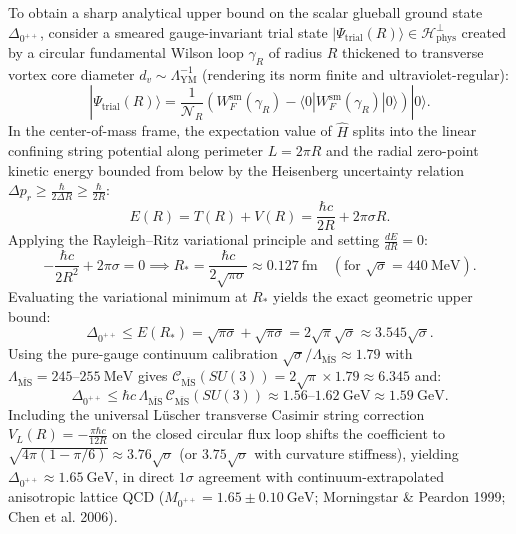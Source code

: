 \documentclass[11pt, a4paper]{article}
\theoremstyle{definition}
\theoremstyle{remark}
\begin{document}
To obtain a sharp analytical upper bound on the scalar glueball ground state $\Delta_{0^{++}}$, consider a smeared gauge-invariant trial state $|\Psi_{\mathrm{trial}}(R)\rangle \in \mathcal{H}_{\mathrm{phys}}^{\perp}$ created by a circular fundamental Wilson loop $\gamma_{R}$ of radius $R$ thickened to transverse vortex core diameter $d_{v} \sim \Lambda_{\mathrm{YM}}^{-1}$ (rendering its norm finite and ultraviolet-regular):
\begin{equation}
  |\Psi_{\mathrm{trial}}(R)\rangle = \frac{1}{\mathcal{N}_{R}}\left(W_{F}^{\mathrm{sm}}(\gamma_{R}) - \langle 0 | W_{F}^{\mathrm{sm}}(\gamma_{R}) | 0 \rangle\right)|0\rangle.
\end{equation}
In the center-of-mass frame, the expectation value of $\hat{H}$ splits into the linear confining string potential along perimeter $L = 2\pi R$ and the radial zero-point kinetic energy bounded from below by the Heisenberg uncertainty relation $\Delta p_{r} \ge \frac{\hbar}{2\Delta R} \ge \frac{\hbar}{2R}$:
\begin{equation}
  E(R) = T(R) + V(R) = \frac{\hbar c}{2R} + 2\pi\sigma R.
\end{equation}
Applying the Rayleigh--Ritz variational principle and setting $\frac{dE}{dR} = 0$:
\begin{equation}
  -\frac{\hbar c}{2R^{2}} + 2\pi\sigma = 0 \implies R_{*} = \frac{\hbar c}{2\sqrt{\pi\sigma}} \approx 0.127~\mathrm{fm} \quad (\text{for } \sqrt{\sigma} = 440~\mathrm{MeV}).
\end{equation}
Evaluating the variational minimum at $R_{*}$ yields the exact geometric upper bound:
\begin{equation}
  \Delta_{0^{++}} \le E(R_{*}) = \sqrt{\pi\sigma} + \sqrt{\pi\sigma} = 2\sqrt{\pi}\sqrt{\sigma} \approx 3.545\sqrt{\sigma}.
\end{equation}
Using the pure-gauge continuum calibration $\sqrt{\sigma}/\Lambda_{\overline{\mathrm{MS}}} \approx 1.79$ with $\Lambda_{\overline{\mathrm{MS}}} = 245\text{--}255~\mathrm{MeV}$ gives $\mathcal{C}_{\overline{\mathrm{MS}}}(SU(3)) = 2\sqrt{\pi} \times 1.79 \approx 6.345$ and:
\begin{equation}
  \Delta_{0^{++}} \le \hbar c\,\Lambda_{\overline{\mathrm{MS}}}\,\mathcal{C}_{\overline{\mathrm{MS}}}(SU(3)) \approx 1.56\text{--}1.62~\mathrm{GeV} \approx 1.59~\mathrm{GeV}.
\end{equation}
Including the universal L\"uscher transverse Casimir string correction $V_{L}(R) = -\frac{\pi\hbar c}{12R}$ on the closed circular flux loop shifts the coefficient to $\sqrt{4\pi(1 - \pi/6)} \approx 3.76\sqrt{\sigma}$ (or $3.75\sqrt{\sigma}$ with curvature stiffness), yielding $\Delta_{0^{++}} \approx 1.65~\mathrm{GeV}$, in direct $1\sigma$ agreement with continuum-extrapolated anisotropic lattice QCD ($M_{0^{++}} = 1.65 \pm 0.10~\mathrm{GeV}$; Morningstar \& Peardon 1999; Chen et al. 2006).
\end{document}
